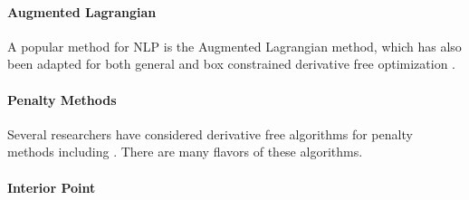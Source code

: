 \documentclass{article}
\begin{document}
\paragraph{Augmented Lagrangian}
A popular method for NLP is the Augmented Lagrangian method, which has also been adapted for both general and box constrained derivative free optimization \cite{augmented}.
\paragraph{Penalty Methods}
Several researchers have considered derivative free algorithms for penalty methods including \cite{DUMMY:LiuzziLS10}.
There are many flavors of these algorithms.

\paragraph{Interior Point}




\end{document}
